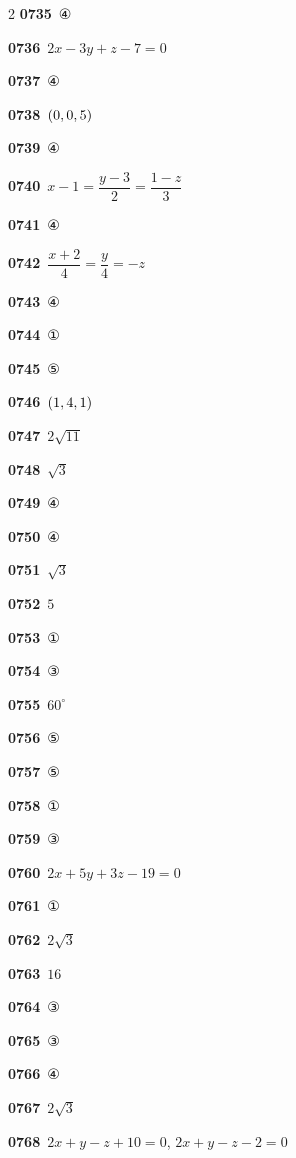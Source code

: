 \documentclass[10pt,a4paper]{article}
\begin{document}
\begin{multicols}{2}
\noindent\textbf{0735}\ ④\par
\noindent\textbf{0736}\ $2x-3y+z-7=0$\par
\noindent\textbf{0737}\ ④\par
\noindent\textbf{0738}\ $(0{,}\mkern3mu\mathopen{}0{,}\mkern3mu\mathopen{}5)$\par
\noindent\textbf{0739}\ ④\par
\noindent\textbf{0740}\ $x-1=\dfrac{y-3}{2}=\dfrac{1-z}{3}$\par
\noindent\textbf{0741}\ ④\par
\noindent\textbf{0742}\ $\dfrac{x+2}{4}=\dfrac{y}{4}=-z$\par
\noindent\textbf{0743}\ ④\par
\noindent\textbf{0744}\ ①\par
\noindent\textbf{0745}\ ⑤\par
\noindent\textbf{0746}\ $(1{,}\mkern3mu\mathopen{}4{,}\mkern3mu\mathopen{}1)$\par
\noindent\textbf{0747}\ $2\sqrt{11}$\par
\noindent\textbf{0748}\ $\sqrt{3}$\par
\noindent\textbf{0749}\ ④\par
\noindent\textbf{0750}\ ④\par
\noindent\textbf{0751}\ $\sqrt{3}$\par
\noindent\textbf{0752}\ $5$\par
\noindent\textbf{0753}\ ①\par
\noindent\textbf{0754}\ ③\par
\noindent\textbf{0755}\ $60^\circ$\par
\noindent\textbf{0756}\ ⑤\par
\noindent\textbf{0757}\ ⑤\par
\noindent\textbf{0758}\ ①\par
\noindent\textbf{0759}\ ③\par
\noindent\textbf{0760}\ $2x+5y+3z-19=0$\par
\noindent\textbf{0761}\ ①\par
\noindent\textbf{0762}\ $2\sqrt{3}$\par
\noindent\textbf{0763}\ $16$\par
\noindent\textbf{0764}\ ③\par
\noindent\textbf{0765}\ ③\par
\noindent\textbf{0766}\ ④\par
\noindent\textbf{0767}\ $2\sqrt{3}$\par
\noindent\textbf{0768}\ $2x+y-z+10=0$, $2x+y-z-2=0$\par

\end{multicols}
\end{document}
